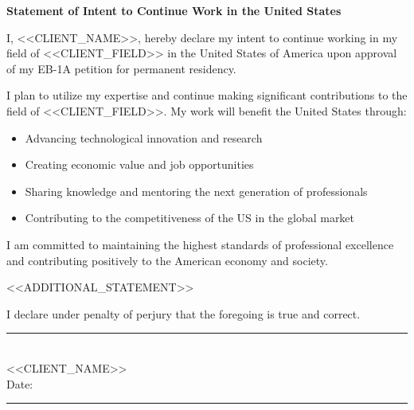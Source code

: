 \documentclass[12pt,letterpaper]{article}
\newcommand{\clientname}{<<CLIENT_NAME>>}
\newcommand{\clientfield}{<<CLIENT_FIELD>>}
\begin{document}
\begin{center}
\Large\textbf{Statement of Intent to Continue Work in the United States}
\end{center}

\vspace{2em}

I, \clientname{}, hereby declare my intent to continue working in my field of \clientfield{} in the United States of America upon approval of my EB-1A petition for permanent residency.

I plan to utilize my expertise and continue making significant contributions to the field of \clientfield{}. My work will benefit the United States through:

\begin{itemize}[leftmargin=2em]
    \item Advancing technological innovation and research
    \item Creating economic value and job opportunities
    \item Sharing knowledge and mentoring the next generation of professionals
    \item Contributing to the competitiveness of the US in the global market
\end{itemize}

I am committed to maintaining the highest standards of professional excellence and contributing positively to the American economy and society.

<<ADDITIONAL_STATEMENT>>

I declare under penalty of perjury that the foregoing is true and correct.

\vspace{4em}

\noindent\rule{6cm}{0.4pt}\\
\clientname\\
Date: \rule{4cm}{0.4pt}
\end{document}
